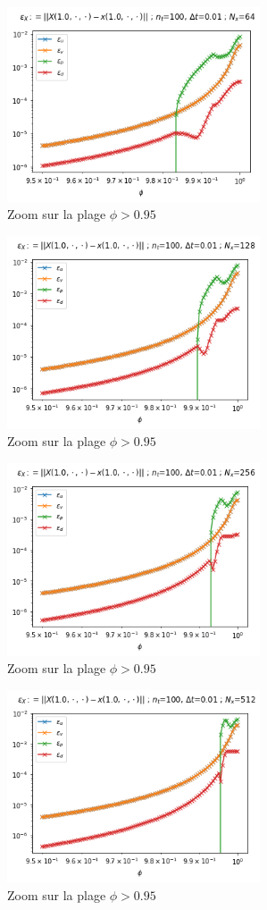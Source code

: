 \begin{figure}[htp]
    \centering
    \includegraphics[width=7.5cm]{Images/brinkman/porosite/64.png}
    \caption{Zoom sur la plage $\phi > 0.95$}
\end{figure}

\begin{figure}[htp]
    \centering
    \includegraphics[width=7.5cm]{Images/brinkman/porosite/128.png}
    \caption{Zoom sur la plage $\phi > 0.95$}
\end{figure}

\begin{figure}[htp]
    \centering
    \includegraphics[width=7.5cm]{Images/brinkman/porosite/256.png}
    \caption{Zoom sur la plage $\phi > 0.95$}
\end{figure}

\begin{figure}[htp]
    \centering
    \includegraphics[width=7.5cm]{Images/brinkman/porosite/512.png}
    \caption{Zoom sur la plage $\phi > 0.95$}
\end{figure}

